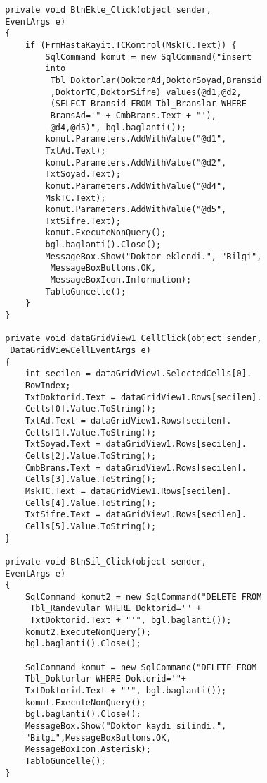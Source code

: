 \begin{lstlisting}
        private void BtnEkle_Click(object sender, 
        EventArgs e)
        {
            if (FrmHastaKayit.TCKontrol(MskTC.Text)) {
                SqlCommand komut = new SqlCommand("insert 
                into
                 Tbl_Doktorlar(DoktorAd,DoktorSoyad,Bransid
                 ,DoktorTC,DoktorSifre) values(@d1,@d2,
                 (SELECT Bransid FROM Tbl_Branslar WHERE 
                 BransAd='" + CmbBrans.Text + "'),
                 @d4,@d5)", bgl.baglanti());
                komut.Parameters.AddWithValue("@d1", 
                TxtAd.Text);
                komut.Parameters.AddWithValue("@d2", 
                TxtSoyad.Text);
                komut.Parameters.AddWithValue("@d4", 
                MskTC.Text);
                komut.Parameters.AddWithValue("@d5", 
                TxtSifre.Text);
                komut.ExecuteNonQuery();
                bgl.baglanti().Close();
                MessageBox.Show("Doktor eklendi.", "Bilgi",
                 MessageBoxButtons.OK, 
                 MessageBoxIcon.Information);
                TabloGuncelle();
            }
        }

        private void dataGridView1_CellClick(object sender,
         DataGridViewCellEventArgs e)
        {
            int secilen = dataGridView1.SelectedCells[0].
            RowIndex;
            TxtDoktorid.Text = dataGridView1.Rows[secilen].
            Cells[0].Value.ToString();
            TxtAd.Text = dataGridView1.Rows[secilen].
            Cells[1].Value.ToString();
            TxtSoyad.Text = dataGridView1.Rows[secilen].
            Cells[2].Value.ToString();
            CmbBrans.Text = dataGridView1.Rows[secilen].
            Cells[3].Value.ToString();
            MskTC.Text = dataGridView1.Rows[secilen].
            Cells[4].Value.ToString();
            TxtSifre.Text = dataGridView1.Rows[secilen].
            Cells[5].Value.ToString();
        }

        private void BtnSil_Click(object sender, 
        EventArgs e)
        {
            SqlCommand komut2 = new SqlCommand("DELETE FROM
             Tbl_Randevular WHERE Doktorid='" + 
             TxtDoktorid.Text + "'", bgl.baglanti());
            komut2.ExecuteNonQuery();
            bgl.baglanti().Close();

            SqlCommand komut = new SqlCommand("DELETE FROM 
            Tbl_Doktorlar WHERE Doktorid='"+ 
            TxtDoktorid.Text + "'", bgl.baglanti());
            komut.ExecuteNonQuery();
            bgl.baglanti().Close();
            MessageBox.Show("Doktor kaydı silindi.",
            "Bilgi",MessageBoxButtons.OK,
            MessageBoxIcon.Asterisk);
            TabloGuncelle();
        }


\end{lstlisting}
